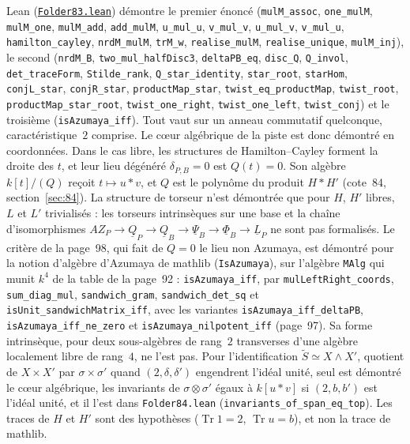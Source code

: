 \begin{remarque}
Lean (\href{\leanblobmain/AlgebraicGeometry/Folder83.lean}{\texttt{Folder83.\allowbreak{}lean}}) démontre le premier énoncé (\texttt{mulM\_assoc}, \texttt{one\_mulM}, \texttt{mulM\_one}, \texttt{mulM\_add}, \texttt{add\_mulM}, \texttt{u\_mul\_u}, \texttt{v\_mul\_v}, \texttt{u\_mul\_v}, \texttt{v\_mul\_u}, \texttt{hamilton\_cayley}, \texttt{nrdM\_mulM}, \texttt{trM\_w}, \texttt{realise\_mulM}, \texttt{realise\_unique}, \texttt{mulM\_inj}), le second (\texttt{nrdM\_B}, \texttt{two\_mul\_halfDisc3}, \texttt{deltaPB\_eq}, \texttt{disc\_Q}, \texttt{Q\_invol}, \texttt{det\_traceForm}, \texttt{Stilde\_rank}, \texttt{Q\_star\_identity}, \texttt{star\_root}, \texttt{starHom}, \texttt{conjL\_star}, \texttt{conjR\_star}, \texttt{productMap\_star}, \texttt{twist\_eq\_productMap}, \texttt{twist\_root}, \texttt{productMap\_star\_root}, \texttt{twist\_one\_right}, \texttt{twist\_one\_left}, \texttt{twist\_conj}) et le troisième (\texttt{isAzumaya\_iff}). Tout vaut sur un anneau commutatif quelconque, caractéristique~$2$ comprise. Le cœur algébrique de la piste est donc démontré en coordonnées. Dans le cas libre, les structures de Hamilton--Cayley forment la droite des $t$, et leur lieu dégénéré $\delta_{P,B} = 0$ est $Q(t) = 0$. Son algèbre $k[t]/(Q)$ reçoit $t \mapsto u * v$, et $Q$ est le polynôme du produit $H * H'$ (cote~84, section~\ref{sec:84}). La structure de torseur n'est démontrée que pour $H$, $H'$ libres, $L$ et $L'$ trivialisés : les torseurs intrinsèques sur une base et la chaîne d'isomorphismes $AZ_P \to \underline{Q}_P \to \underline{Q}_B \to \underline{\Psi}_B \to \underline{\Phi}_B \to \underline{L}_P$ ne sont pas formalisés. Le critère  de la page~98, qui fait de $Q = 0$ le lieu non Azumaya, est démontré pour la notion d'algèbre d'Azumaya de mathlib (\texttt{IsAzumaya}), sur l'algèbre \texttt{MAlg} qui munit $k^4$ de la table de la page~92 : \texttt{isAzumaya\_iff}, par \texttt{mulLeftRight\_coords}, \texttt{sum\_diag\_mul}, \texttt{sandwich\_gram}, \texttt{sandwich\_det\_sq} et \texttt{isUnit\_sandwichMatrix\_iff}, avec les variantes \texttt{isAzumaya\_iff\_deltaPB}, \texttt{isAzumaya\_iff\_ne\_zero} et \texttt{isAzumaya\_nilpotent\_iff} (page~97). Sa forme intrinsèque, pour deux sous-algèbres de rang~$2$ transverses d'une algèbre localement libre de rang~$4$, ne l'est pas. Pour l'identification $\widetilde S \simeq X \wedge X'$, quotient de $X \times X'$ par $\sigma \times \sigma'$ quand $(2, \delta, \delta')$ engendrent l'idéal unité, seul est démontré le cœur algébrique, les invariants de $\sigma \otimes \sigma'$ égaux à $k[u * v]$ si $(2, b, b')$ est l'idéal unité, et il l'est dans \texttt{Folder84.\allowbreak{}lean} (\texttt{invariants\_of\_span\_eq\_top}). Les traces de $H$ et $H'$ sont des hypothèses ($\operatorname{Tr}1 = 2$, $\operatorname{Tr}u = b$), et non la trace de mathlib.
\end{remarque}
